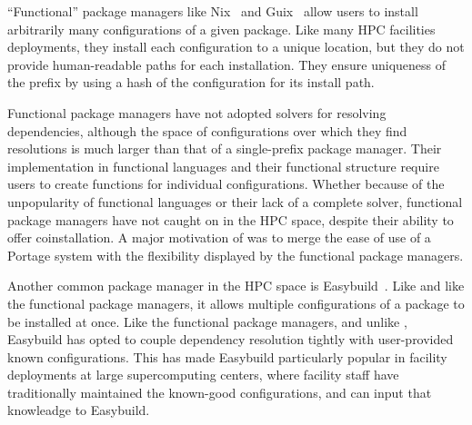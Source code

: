``Functional'' package managers like Nix~\cite{dolstra+:icfp08,dolstra+:lisa04} and Guix~\cite{courtes-guix-2015} allow users to install arbitrarily many configurations of a given package.
Like many HPC facilities deployments, they install each configuration to a unique location, but they do not provide human-readable paths for each installation.
They ensure uniqueness of the prefix by using a hash of the configuration for its install path.

Functional package managers have not adopted solvers for resolving dependencies, although the space of configurations over which they find resolutions is much larger than that of a single-prefix package manager.
Their implementation in functional languages and their functional structure require users to create functions for individual configurations.
Whether because of the unpopularity of functional languages or their lack of a complete solver, functional package managers have not caught on in the HPC space, despite their ability to offer coinstallation.
A major motivation of \spack{} was to merge the ease of use of a Portage system with the flexibility displayed by the functional package managers.

Another common package manager in the HPC space is Easybuild~\cite{hoste+:pyhpc12}.
Like \spack{} and like the functional package managers, it allows multiple configurations of a package to be installed at once.
Like the functional package managers, and unlike \spack, Easybuild has opted to couple dependency resolution tightly with user-provided known configurations.
This has made Easybuild particularly popular in facility deployments at large supercomputing centers, where facility staff have traditionally maintained the known-good configurations, and can input that knowleadge to Easybuild.
